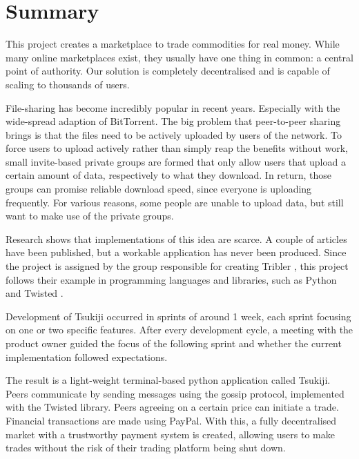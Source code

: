 \section*{Summary} 
This project creates a marketplace to trade commodities for real money.
While many online marketplaces exist, they usually have one thing in common: a central point of authority.
Our solution is completely decentralised and is capable of scaling to thousands of users.

File-sharing has become incredibly popular in recent years. 
Especially with the wide-spread adaption of BitTorrent. 
The big problem that peer-to-peer sharing brings is that the files need to be actively uploaded by users of the network.
To force users to upload actively rather than simply reap the benefits without work, small invite-based private groups are formed that only allow users that upload a certain amount of data, respectively to what they download.
In return, those groups can promise reliable download speed, since everyone is uploading frequently.
For various reasons, some people are unable to upload data, but still want to make use of the private groups.

Research shows that implementations of this idea are scarce.
A couple of articles have been published, but a workable application has never been produced.
Since the project is assigned by the group responsible for creating Tribler \cite{tribler}, this project follows their example in programming languages and libraries, such as Python and Twisted \cite{twisted}.

Development of Tsukiji occurred in sprints of around 1 week, each sprint focusing on one or two specific features.
After every development cycle, a meeting with the product owner guided the focus of the following sprint and whether the current implementation followed expectations.

The result is a light-weight terminal-based python application called Tsukiji.
Peers communicate by sending messages using the gossip protocol, implemented with the Twisted library.
Peers agreeing on a certain price can initiate a trade.
Financial transactions are made using PayPal.
With this, a fully decentralised market with a trustworthy payment system is created, allowing users to make trades without the risk of their trading platform being shut down.